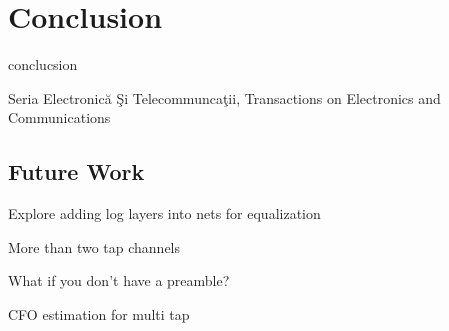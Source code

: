 \chapter{Conclusion}
conclucsion

Seria Electronic\u{a} \c{S}i Telecommunca\c{t}ii, Transactions on Electronics and Communications

\section{Future Work}

Explore adding log layers into nets for equalization

More than two tap channels

What if you don't have a preamble?

CFO estimation for multi tap

